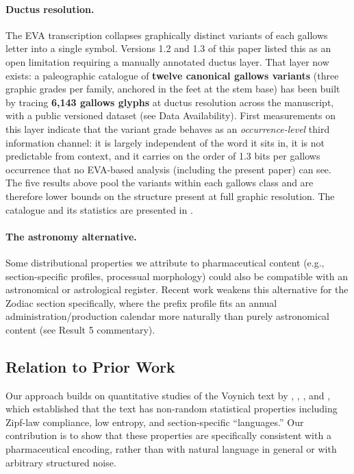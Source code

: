 \documentclass[11pt,a4paper]{article}
\begin{document}
\paragraph{Ductus resolution.} The EVA transcription collapses graphically distinct variants of each gallows letter into a single symbol. Versions 1.2 and 1.3 of this paper listed this as an open limitation requiring a manually annotated ductus layer. That layer now exists: a paleographic catalogue of \textbf{twelve canonical gallows variants} (three graphic grades per family, anchored in the feet at the stem base) has been built by tracing \textbf{6{,}143 gallows glyphs} at ductus resolution across the manuscript, with a public versioned dataset (see Data Availability). First measurements on this layer indicate that the variant grade behaves as an \textit{occurrence-level} third information channel: it is largely independent of the word it sits in, it is not predictable from context, and it carries on the order of 1.3 bits per gallows occurrence that no EVA-based analysis (including the present paper) can see. The five results above pool the variants within each gallows class and are therefore lower bounds on the structure present at full graphic resolution. The catalogue and its statistics are presented in \citet{Placa2026c}.

\paragraph{The astronomy alternative.} Some distributional properties we attribute to pharmaceutical content (e.g., section-specific profiles, processual morphology) could also be compatible with an astronomical or astrological register. Recent work weakens this alternative for the Zodiac section specifically, where the prefix profile fits an annual administration/production calendar more naturally than purely astronomical content (see Result 5 commentary).

\subsection{Relation to Prior Work}

Our approach builds on quantitative studies of the Voynich text by \citet{Currier1976}, \citet{DImperio1978}, \citet{Stolfi2005}, and \citet{Amancio2013}, which established that the text has non-random statistical properties including Zipf-law compliance, low entropy, and section-specific ``languages.'' Our contribution is to show that these properties are specifically consistent with a pharmaceutical encoding, rather than with natural language in general or with arbitrary structured noise.
\end{document}
